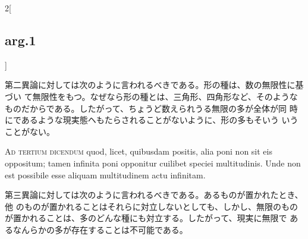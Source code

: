 \documentclass[paper=a4paper,fontsize=10pt,jafontsize=9pt,titlepage]{jlreq}
\begin{document}
\begin{paracol}{2}[\subsection{arg.1}]
\switchcolumn

第二異論に対しては次のように言われるべきである。形の種は、数の無限性に基づい
 て無限性をもつ。なぜなら形の種とは、三角形、四角形など、そのような
 ものだからである。したがって、ちょうど数えられうる無限の多が全体が同
 時にであるような現実態ヘもたらされることがないように、形の多もそいう
 いうことがない。

\switchcolumn*[\subsection{ad.3}]

{\scshape Ad tertium dicendum} quod, licet, quibusdam positis, alia poni non
 sit eis oppositum; tamen infinita poni opponitur cuilibet speciei
 multitudinis. Unde non est possibile esse aliquam multitudinem actu
 infinitam.

\switchcolumn

第三異論に対しては次のように言われるべきである。あるものが置かれたとき、他
 のものが置かれることはそれらに対立しないとしても、しかし、無限のもの
 が置かれることは、多のどんな種にも対立する。したがって、現実に無限で
 あるなんらかの多が存在することは不可能である。

\end{paracol}
\end{document}

